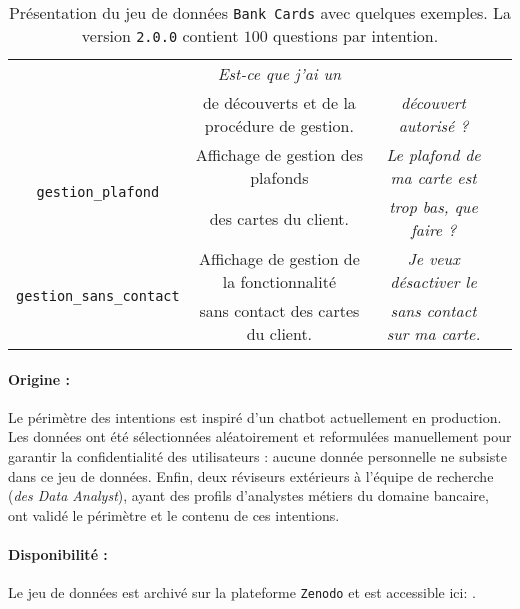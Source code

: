\begin{table}[!htb]
\begin{center}
\begin{scriptsize}
\begin{tabular}{|c|c|c|c|}
					& \textit{Est-ce que j'ai un}
					\tabularnewline
					& de découverts et de la procédure de gestion.
					& \textit{découvert autorisé ?}
					\tabularnewline
					\hline
				\multirow{2}{*}{\texttt{gestion\_plafond}}
					& Affichage de gestion des plafonds
					& \textit{Le plafond de ma carte est}
					\tabularnewline
					& des cartes du client.
					& \textit{trop bas, que faire ?}
					\tabularnewline
					\hline
				\multirow{2}{*}{\texttt{gestion\_sans\_contact}}
					& Affichage de gestion de la fonctionnalité
					& \textit{Je veux désactiver le}
					\tabularnewline
					&  sans contact des cartes du client.
					& \textit{sans contact sur ma carte.}
					\tabularnewline
					\hline
			\end{tabular}
			\end{scriptsize}
			\end{center}
			\caption{
				Présentation du jeu de données \texttt{Bank Cards} avec quelques exemples.
				La version \texttt{2.0.0} contient $100$ questions par intention.
			}
			\label{table:A.1-DATASET-BANK-CARDS}
		\end{table}
		
		\paragraph{Origine :}
		Le périmètre des intentions est inspiré d'un chatbot actuellement en production.
		Les données ont été sélectionnées aléatoirement et reformulées manuellement pour garantir la confidentialité des utilisateurs : aucune donnée personnelle ne subsiste dans ce jeu de données.
		Enfin, deux réviseurs extérieurs à l'équipe de recherche (\textit{des Data Analyst}), ayant des profils d'analystes métiers du domaine bancaire, ont validé le périmètre et le contenu de ces intentions.
		
		\paragraph{Disponibilité :}
		Le jeu de données est archivé sur la plateforme \texttt{Zenodo} et est accessible ici: \cite{schild:2022:french-trainset-chatbots}.


	\newpage
